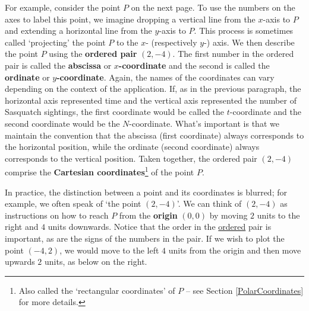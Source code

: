 \medskip

For example, consider the point $P$ on the next page.  To use the numbers on the axes to label this point, we imagine dropping a vertical line from the $x$-axis to $P$ and extending a horizontal line from the $y$-axis to $P$.  This process is sometimes called `projecting' the point $P$ to the $x$- (respectively $y$-) axis.  We then describe the point $P$ using the  \textbf{ordered pair} $(2,-4)$.  The first number in the ordered pair is called the  \textbf{abscissa} or  \textbf{\boldmath $x$-coordinate} and the second is called the  \textbf{ordinate} or  \textbf{\boldmath $y$-coordinate}.  Again, the names of the coordinates can vary depending on the context of the application. If, as in the previous paragraph, the horizontal axis represented time and the vertical axis represented the number of Sasquatch sightings, the first coordinate would be called the $t$-coordinate and the second coordinate would be the $N$-coordinate. What's important is that we maintain the convention that the abscissa (first coordinate) always corresponds to the horizontal position, while the ordinate (second coordinate) always corresponds to the vertical position.  Taken together, the ordered pair $(2,-4)$ comprise the \textbf{Cartesian coordinates}\footnote{Also called the `rectangular coordinates' of $P$ -- see Section \ref{PolarCoordinates} for more details.} of the point $P$. 

\medskip

In practice, the distinction between a point and its coordinates is blurred; for example, we often speak of `the point $(2,-4)$'.  We can think of $(2,-4)$ as instructions on how to reach $P$ from the  {\bf origin} $(0, 0)$ by moving $2$ units to the right and $4$ units downwards.  Notice that the order in the \underline{ordered} pair is important, as are the signs of the numbers in the pair. If we wish to plot the point $(-4,2)$, we would move to the left $4$ units from the origin and then move upwards $2$ units, as below on the right.

\medskip

